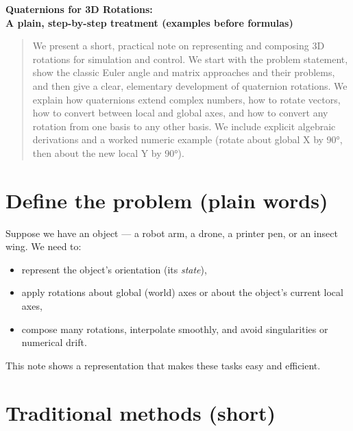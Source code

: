 \documentclass[11pt]{article}
\begin{document}
\begin{center}
    \Large\bfseries Quaternions for 3D Rotations: \\
    A plain, step-by-step treatment (examples before formulas)
\end{center}

\vspace{6pt}
\begin{abstract}
We present a short, practical note on representing and composing 3D rotations for simulation and control. We start with the problem statement, show the classic Euler angle and matrix approaches and their problems, and then give a clear, elementary development of quaternion rotations. We explain how quaternions extend complex numbers, how to rotate vectors, how to convert between local and global axes, and how to convert any rotation from one basis to any other basis. We include explicit algebraic derivations and a worked numeric example (rotate about global X by 90°, then about the new local Y by 90°).
\end{abstract}

\section{Define the problem (plain words)}
Suppose we have an object — a robot arm, a drone, a printer pen, or an insect wing. We need to:
\begin{itemize}
  \item represent the object's orientation (its \emph{state}),
  \item apply rotations about global (world) axes or about the object's current local axes,
  \item compose many rotations, interpolate smoothly, and avoid singularities or numerical drift.
\end{itemize}
This note shows a representation that makes these tasks easy and efficient.

\section{Traditional methods (short)}
\end{document}
